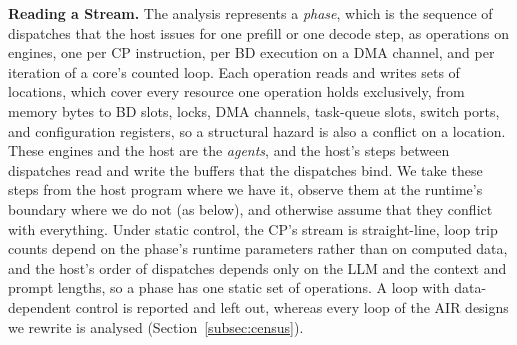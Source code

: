 \textbf{Reading a Stream.}
\label{subsec:reading}
\label{subsec:model}
The analysis represents a \emph{phase}, which is the sequence of dispatches that the host issues for one prefill or one decode step, as operations on engines, one per CP instruction, per BD execution on a DMA channel, and per iteration of a core's counted loop.
Each operation reads and writes sets of locations, which cover every resource one operation holds exclusively, from memory bytes to BD slots, locks, DMA channels, task-queue slots, switch ports, and configuration registers, so a structural hazard is also a conflict on a location.
These engines and the host are the \emph{agents}, and the host's steps between dispatches read and write the buffers that the dispatches bind.
We take these steps from the host program where we have it, observe them at the runtime's boundary where we do not (as below), and otherwise assume that they conflict with everything.
Under static control, the CP's stream is straight-line, loop trip counts depend on the phase's runtime parameters rather than on computed data, and the host's order of dispatches depends only on the LLM and the context and prompt lengths, so a phase has one static set of operations.
A loop with data-dependent control is reported and left out, whereas every loop of the AIR designs we rewrite is analysed (Section~\ref{subsec:census}).

